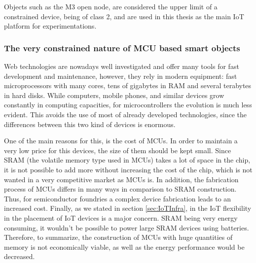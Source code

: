 Objects such as the M3 open node, are considered the upper limit of a constrained device, being of class 2, and are used in this thesis as the main IoT platform for experimentations.

\subsubsection{The very constrained nature of MCU based smart objects}
Web technologies are nowadays well investigated and offer many tools for fast development and maintenance, however, they rely in modern equipment: fast microprocessors with many cores, tens of gigabytes in RAM and several terabytes in hard disks.
While computers, mobile phones, and similar devices grow constantly in computing capacities, for microcontrollers the evolution is much less evident.
This avoids the use of most of already developed technologies, since the differences between this two kind of devices is enormous.

One of the main reasons for this, is the cost of MCUs.
In order to maintain a very low price for this devices, the size of them should be kept small.
Since SRAM (the volatile memory type used in MCUs) takes a lot of space in the chip, it is not possible to add more without increasing the cost of the chip, which is not wanted in a very competitive market as MCUs is.
In addition, the fabrication process of MCUs differs in many ways in comparison to SRAM construction.
Thus, for semiconductor foundries a complex device fabrication leads to an increased cost.
Finally, as we stated in section \ref{sec:IoTInfra}, in the IoT flexibility in the placement of IoT devices is a major concern.
SRAM being very energy consuming, it wouldn't be possible to power large SRAM devices using batteries.
Therefore, to summarize, the construction of MCUs with huge quantities of memory is not economically viable, as well as the energy performance would be decreased.

